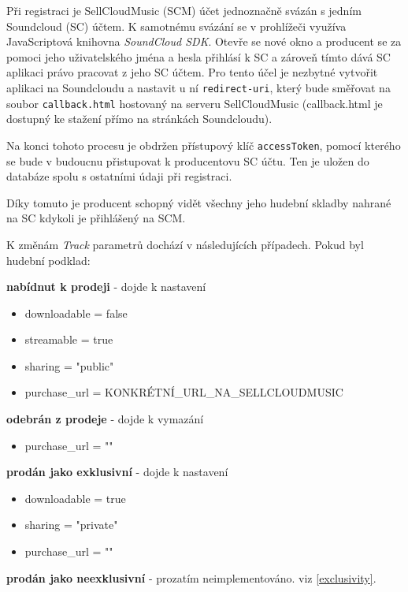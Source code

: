 \documentclass[12pt]{article}
\begin{document}
Při registraci je SellCloudMusic (SCM) účet jednoznačně svázán s jedním Soundcloud (SC) účtem. K samotnému svázání se v prohlížeči využíva JavaScriptová knihovna \emph{SoundCloud SDK}. Otevře se nové okno a producent se za pomoci jeho uživatelského jména a hesla přihlásí k SC a zároveň tímto dává SC aplikaci právo pracovat z jeho SC účtem. Pro tento účel je nezbytné vytvořit aplikaci na Soundcloudu a nastavit u ní \texttt{redirect-uri}, který bude směřovat na soubor \texttt{callback.html} hostovaný na serveru SellCloudMusic (callback.html je dostupný ke stažení přímo na stránkách Soundcloudu).

Na konci tohoto procesu je obdržen přístupový klíč \texttt{accessToken}, pomocí kterého se bude v budoucnu přistupovat k producentovu SC účtu. Ten je uložen do databáze spolu s ostatními údaji při registraci.

Díky tomuto je producent schopný vidět všechny jeho hudební skladby nahrané na SC kdykoli je přihlášený na SCM. 

K změnám \emph{Track} parametrů dochází v následujících případech. Pokud byl hudební podklad:

\begin{description}
\item{\textbf{nabídnut k prodeji}} - dojde k nastavení
  \begin{itemize}
  \item downloadable = false
  \item streamable = true
  \item sharing = "public"
  \item purchase\_url = KONKRÉTNÍ\_URL\_NA\_SELLCLOUDMUSIC
  \end{itemize}

\item{\textbf{odebrán z prodeje}} - dojde k vymazání
  \begin{itemize}
  \item purchase\_url = ""
  \end{itemize}

\item{\textbf{prodán jako exklusivní}} - dojde k nastavení
  \begin{itemize}
  \item downloadable = true
  \item sharing = "private"
  \item purchase\_url = ""
  \end{itemize}

\item{\textbf{prodán jako neexklusivní}} - prozatím neimplementováno. viz \ref{exclusivity}.
\end{description}
\end{document}

